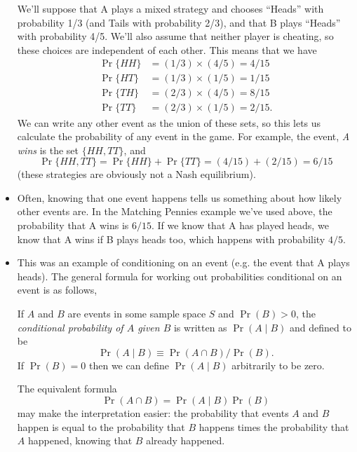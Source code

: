 \begin{itemize}
\begin{ex}
    We'll suppose that A plays a mixed strategy and chooses ``Heads''
    with probability 1/3 (and Tails with probability 2/3), and that B
    plays ``Heads'' with probability 4/5.  We'll also assume that
    neither player is cheating, so these choices are independent of
    each other.  This means that we have
    \begin{align*}
      \Pr \{HH\} &= (1/3) \times (4/5) = 4/15 \\
      \Pr \{HT\} &= (1/3) \times (1/5) = 1/15 \\
      \Pr \{TH\} &= (2/3) \times (4/5) = 8/15 \\
      \Pr \{TT\} &= (2/3) \times (1/5) = 2/15.
    \end{align*}
    We can write any other event as the union of these sets, so this
    lets us calculate the probability of any event in the game.  For
    example, the event, \emph{A wins} is the set $\{HH,TT\}$, and
    \begin{equation*}
      \Pr \{HH, TT\} = \Pr \{HH\} + \Pr \{TT\} = (4/15) + (2/15) = 6/15
    \end{equation*}
    (these strategies are obviously not a Nash equilibrium).
  \end{ex}

\item Often, knowing that one event happens tells us something about
  how likely other events are.  In the Matching Pennies example we've
  used above, the probability that A wins is $6/15$.  If we know that
  A has played heads, we know that A wins if B plays heads too, which
  happens with probability $4/5$.

\item This was an example of conditioning on an event (e.g. the event
  that A plays heads).  The general formula for working out
  probabilities conditional on an event is as follows,

  \begin{defn}
    If $A$ and $B$ are events in some sample space $S$ and $\Pr(B)>0$,
    the \emph{conditional probability of $A$ given $B$} is written as
    $\Pr(A \mid B)$ and defined to be
    \begin{equation*}
      \Pr(A \mid B) \equiv \Pr(A \cap B) / \Pr(B).
    \end{equation*}
    If $\Pr(B) = 0$ then we can define $\Pr(A \mid B)$ arbitrarily to be
    zero.
  \end{defn}

  The equivalent formula
  \begin{equation*}
    \Pr(A \cap B) = \Pr(A \mid B) \Pr(B)
  \end{equation*}
  may make the interpretation easier: the probability that events $A$
  and $B$ happen is equal to the probability that $B$ happens times
  the probability that $A$ happened, knowing that $B$ already
  happened.


\end{itemize}
